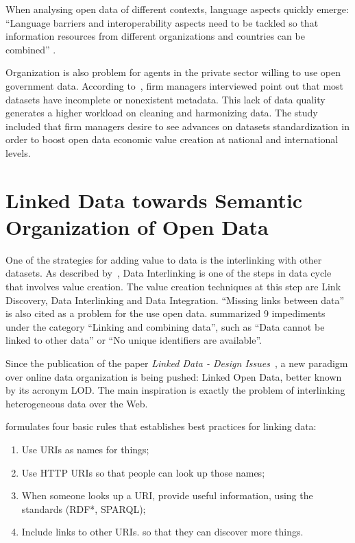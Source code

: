 When analysing open data of different contexts, language aspects quickly emerge: ``Language barriers and interoperability aspects need to be tackled so that information resources from different organizations and countries can be combined'' \cite{Zuiderwijk2012}.

Organization is also problem for agents in the private sector willing to use open government data.
According to~, firm managers interviewed point out that most datasets have incomplete or nonexistent metadata.
This lack of data quality generates a higher workload on cleaning and harmonizing data.
The study included that firm managers desire to see advances on datasets standardization in order to boost open data economic value creation at national and international levels.

\section{Linked Data towards Semantic Organization of Open Data}
\label{sec:LOD}

One of the strategies for adding value to data is the interlinking with other datasets.
As described by~, Data Interlinking is one of the steps in data cycle that involves value creation.
The value creation techniques at this step are Link Discovery, Data Interlinking and Data Integration.
``Missing links between data'' is also cited as a problem for the use open data.
 summarized 9 impediments under the category ``Linking and combining data'', such as ``Data cannot be linked to other data'' or ``No unique identifiers are available''.

Since the publication of the paper \emph{Linked Data - Design Issues}~\cite{Berners-Lee2006}, a new paradigm over online data organization is being pushed: Linked Open Data, better known by its acronym LOD.
The main inspiration is exactly the problem of interlinking heterogeneous data over the Web.

 formulates four basic rules that establishes best practices for linking data: 

\begin{enumerate}
	\item Use URIs as names for things;
	\item Use HTTP URIs so that people can look up those names;
	\item When someone looks up a URI, provide useful information, using the standards (RDF*, SPARQL);
	\item Include links to other URIs. so that they can discover more things.
\end{enumerate}

